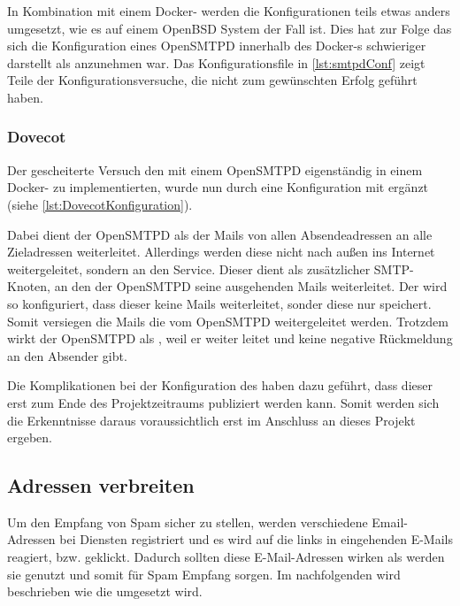 \documentclass[a4paper,11pt,singlespacing]{article}
\begin{document}
			In Kombination mit einem Docker- werden die Konfigurationen teils etwas anders umgesetzt, wie es auf einem OpenBSD System der Fall ist. 
Dies hat zur Folge das sich die Konfiguration eines \textsf{OpenSMTPD} innerhalb des Docker-s schwieriger darstellt als anzunehmen war. Das Konfigurationsfile in \autoref{lst:smtpdConf} zeigt Teile der Konfigurationsversuche, die nicht zum gewünschten Erfolg geführt haben. 
						
		\subsubsection{Dovecot}\label{OpenRelayDovecot}
			Der gescheiterte Versuch den  mit einem \textsf{OpenSMTPD} eigenständig in einem Docker- zu implementierten, wurde nun durch eine Konfiguration mit  ergänzt (siehe \autoref{lst:DovecotKonfiguration}).
			
			Dabei dient der \textsf{OpenSMTPD} als  der Mails von allen Absendeadressen an alle Zieladressen weiterleitet. Allerdings werden diese nicht nach au{\ss}en ins Internet weitergeleitet, sondern an den  Service. Dieser dient als zusätzlicher SMTP-Knoten, an den der \textsf{OpenSMTPD} seine ausgehenden Mails weiterleitet. Der  wird so konfiguriert, dass dieser keine Mails weiterleitet, sonder diese nur speichert. Somit versiegen die Mails die vom \textsf{OpenSMTPD} weitergeleitet werden. Trotzdem wirkt der \textsf{OpenSMTPD} als , weil er weiter leitet und keine negative Rückmeldung an den Absender gibt.
			
			Die Komplikationen bei der Konfiguration des  haben dazu geführt, dass dieser erst zum Ende des Projektzeitraums publiziert werden kann. Somit werden sich die Erkenntnisse daraus voraussichtlich erst im Anschluss an dieses Projekt ergeben.


	\subsection{Adressen verbreiten}\label{sec:UmsetzungAdressenverbreiten}
		Um den Empfang von Spam sicher zu stellen, werden verschiedene Email-Adressen bei Diensten registriert und es wird auf die links in eingehenden E-Mails reagiert, bzw. geklickt. Dadurch sollten diese E-Mail-Adressen wirken als werden sie genutzt und somit für Spam Empfang sorgen. Im nachfolgenden wird beschrieben wie die umgesetzt wird.
\end{document}
